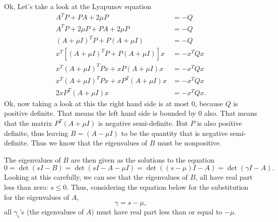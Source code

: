 \documentclass[10pt]{article}
\begin{document}
Ok, Let's take a look at the Lyapunov equation
\begin{equation*}
  \begin{split}
    A^TP + PA + 2\mu P &= -Q \\
    A^TP + 2\mu P + PA + 2\mu P &= -Q\\
    (A + \mu I)^TP + P(A + \mu I) &= -Q\\
    x^T\left[(A + \mu I)^TP + P(A + \mu I)\right]x &= -x^TQx\\
    x^T(A + \mu I)^TPx + xP(A + \mu I)x &= -x^TQx\\
    x^T(A + \mu I)^TPx + xP^T(A + \mu I)x &= -x^TQx\\
    2xP^T(A + \mu I)x &= -x^TQx.
  \end{split}
\end{equation*}
Ok, now taking a look at this the right hand side is at most $0$,
because $Q$ is positive definite.  That means the left hand side is
bounded by $0$ also.  That means that the matrix $P^T(A + \mu I)$ is
negative semi-definite.  But $P$ is also positive definite, thus
leaving $B = (A - \mu I)$ to be the quantity that is negative
semi-definite.   Thus we know that the eigenvalues of $B$ must be
nonpositive. 

The eigenvalues of $B$ are then given as the solutions to the equation
\begin{equation*}
  0 = \det(sI - B) = \det(sI - A - \mu I) = \det\left((s - \mu)I -
    A\right) = \det(\gamma I - A).
\end{equation*}
Looking at this carefully, we can see that the eigenvalues of $B$, all
have real part less than zero: $s \le 0$.  Thus, considering the
equation below for the substitution for 
the eigenvalues of $A$,   
\begin{equation*}
  \gamma = s - \mu,
\end{equation*}
all $\gamma_i$'s (the eigenvalues of $A$) must have real part less
than or equal to $-\mu$. 

% 
% 
\end{document}
